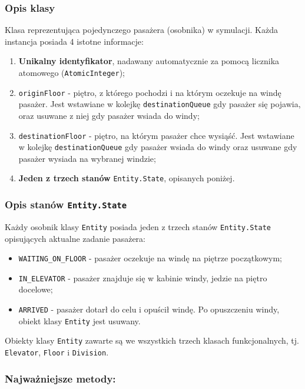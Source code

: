 \documentclass[12pt, a4paper]{article}
\begin{document}
\subsubsection{Opis klasy}
Klasa reprezentująca pojedynczego pasażera (osobnika) w symulacji. Każda instancja posiada 4 istotne informacje:
\begin{enumerate}
    \item \textbf{Unikalny identyfikator}, nadawany automatycznie za pomocą licznika atomowego (\texttt{AtomicInteger});
    \item \texttt{originFloor} - piętro, z którego pochodzi i na którym oczekuje na windę pasażer. Jest wstawiane w kolejkę \texttt{destinationQueue} gdy pasażer się pojawia, 
            oraz usuwane z niej gdy pasażer wsiada do windy;
    \item \texttt{destinationFloor} - piętro, na którym pasażer chce wysiąść. Jest wstawiane w kolejkę \texttt{destinationQueue} gdy pasażer wsiada do windy oraz usuwane
            gdy pasażer wysiada na wybranej windzie; 
    \item \textbf{Jeden z trzech stanów} \texttt{Entity.State}, opisanych poniżej.
\end{enumerate}

\subsubsection{Opis stanów \texttt{Entity.State}}

Każdy osobnik klasy \texttt{Entity} posiada jeden z trzech stanów \texttt{Entity.State} opisujących aktualne zadanie pasażera:
\begin{itemize}
  \item \texttt{WAITING\_ON\_FLOOR} - pasażer oczekuje na windę na piętrze początkowym;
  \item \texttt{IN\_ELEVATOR} - pasażer znajduje się w kabinie windy, jedzie na piętro docelowe;
  \item \texttt{ARRIVED} - pasażer dotarł do celu i opuścił windę. Po opuszczeniu windy, obiekt klasy \texttt{Entity} jest usuwany.
\end{itemize}

Obiekty klasy \texttt{Entity} zawarte są we wszystkich trzech klasach funkcjonalnych, tj. \texttt{Elevator}, \texttt{Floor} i 
\texttt{Division}.

\subsubsection{Najważniejsze metody:}
\end{document}
